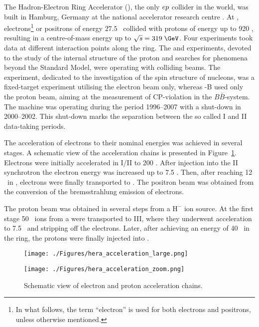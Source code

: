 The Hadron-Electron Ring Accelerator (\hera), the only $\mbox{$e p$}$ collider in the world, was built in Hamburg, Germany at the national accelerator research centre \desy. At \hera, electrons\footnote{In what follows, the term ``electron'' is used for both electrons and positrons, unless otherwise mentioned.} or positrons of energy $27.5$ \GeV\, collided with protons of energy up to 920 \GeV, resulting in a centre-of-mass energy up to $\sqs = 319\; \GeV$. Four experiments took data at different interaction points along the \hera ring. The \zeus and \hone experiments, devoted to the study of the internal structure of the proton and searches for phenomena beyond the Standard Model, were operating with colliding beams. The \hermes experiment, dedicated to the investigation of the spin structure of nucleons, was a fixed-target experiment utilising the electron beam only, whereas \hera-B used only the proton beam, aiming at the measurement of CP-violation in the $B\bar{B}$-system. The \hera machine was operating during the period 1996--2007 with a shut-down in 2000--2002. This shut-down marks the separation between the so called \hera I and \hera II data-taking periods.

The acceleration of electrons to their nominal energies was achieved in several stages. A schematic view of the acceleration chains is presented in Figure~\ref{fig:hera_acceleration}. Electrons were initially accelerated in \linac I/II to 200 \MeV. After injection into the \desy II synchrotron the electron energy was increased up to 7.5 \GeV. Then, after reaching 12 \GeV\, in \petra, electrons were finally transported to \hera. The positron beam was obtained from the conversion of the bremsstrahlung emission of electrons. 

The proton beam was obtained in several steps from a $\text{H}^-$ ion source. At the first stage 50 \MeV\, ions from a \linac were transported to \desy III, where they underwent acceleration to 7.5 \GeV\, and stripping off the electrons. Later, after achieving an energy of 40 \GeV\, in the \petra ring, the protons were finally injected into \hera.

\begin{figure}[htpb]
	\centering
	\begin{subfloat}[]{\texttt{[image: ./Figures/hera\_acceleration\_large.png]}
			\label{fig:hera_acceleration_large}
	 }%
	\end{subfloat}
	\begin{subfloat}[]{\texttt{[image: ./Figures/hera\_acceleration\_zoom.png]}
			\label{fig:hera_acceleration_zoom}
	 }%
	\end{subfloat}
	\caption{Schematic view of electron and proton acceleration chains.}
\label{fig:hera_acceleration}
\end{figure}

